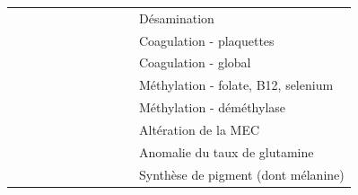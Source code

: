 \begin{table}[]
{\begin{tabular}{@{}lllllllllll@{}}
                         &                                     &                          &                          & \cellcolor[HTML]{F8A102} & \cellcolor[HTML]{F8A102} & \cellcolor[HTML]{F8A102} &                            &                          &                          & Désamination                              \\
\cellcolor[HTML]{F8A102} & \cellcolor[HTML]{F8A102}            &                          &                          &                          &                          & \cellcolor[HTML]{F8A102} &                            &                          &                          & Coagulation - plaquettes                  \\
\cellcolor[HTML]{F8A102} & \cellcolor[HTML]{F8A102}            & \cellcolor[HTML]{F8A102} &                          &                          &                          & \cellcolor[HTML]{F8A102} &                            &                          &                          & Coagulation - global                      \\
\cellcolor[HTML]{F8A102} & \cellcolor[HTML]{F8A102}            &                          & \cellcolor[HTML]{F8A102} &                          &                          &                          &                            &                          &                          & Méthylation - folate, B12, selenium       \\
                         &                                     &                          & \cellcolor[HTML]{F8A102} & \cellcolor[HTML]{F8A102} &                          &                          &                            & \cellcolor[HTML]{F8A102} &                          & Méthylation - déméthylase                 \\
\cellcolor[HTML]{F8A102} & \cellcolor[HTML]{F8A102}            &                          & \cellcolor[HTML]{F8A102} &                          &                          &                          &                            &                          & \cellcolor[HTML]{F8A102} & Altération de la MEC                      \\
                         &                                     & \cellcolor[HTML]{F8A102} &                          & \cellcolor[HTML]{F8A102} & \cellcolor[HTML]{F8A102} &                          &                            &                          &                          & Anomalie du taux de glutamine             \\
\cellcolor[HTML]{F8A102} &                                     &                          &                          & \cellcolor[HTML]{F8A102} &                          &                          & \cellcolor[HTML]{F8A102}   &                          &                          & Synthèse de pigment (dont mélanine)      \\

\end{tabular}}
\end{table}
